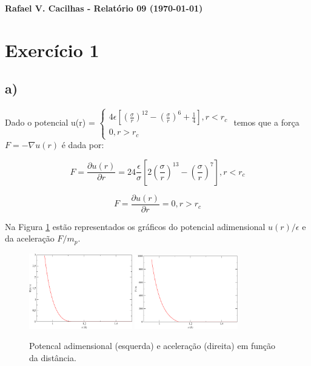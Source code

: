 \documentclass[a4wide]{report}
\begin{document}
\noindent
{\bf Rafael V. Cacilhas  - Relatório 09 (\today)}

\vspace{0.5cm}

\section*{Exercício 1}

\subsection*{a) }

Dado o potencial u(r) = 
$\begin{cases} 
 4\epsilon \left[ \left(\frac{\sigma}{r}\right)^{12} - \left(\frac{\sigma}{r}\right)^6 + \frac{1}{4}      \right], r < r_c \\ 
 0, r > r_c
\end{cases} $
temos que a força $F = -\nabla u(r)$ é dada por:

\begin{equation}
F = \frac{\partial u(r)}{\partial r} = 24\frac{\epsilon}{\sigma} \left[ 2\left( \frac{\sigma}{r}\right)^{13} - \left(\frac{\sigma}{r}\right)^7     \right], r < r_c
\end{equation}

\begin{equation}
F = \frac{\partial u(r)}{\partial r} = 0, r > r_c
\end{equation}

Na Figura \ref{1a} estão representados os gráficos do potencial adimensional $u(r)/\epsilon$ e da aceleração $F/m_p$.

\begin{figure}[!htb]
\centering
\includegraphics[width=0.4\textwidth]{U.pdf}
\includegraphics[width=0.4\textwidth]{forca.pdf}
\caption{Potencal adimensional (esquerda) e aceleração (direita) em função da distância.}
\label{1a}
\end{figure}
\end{document}
